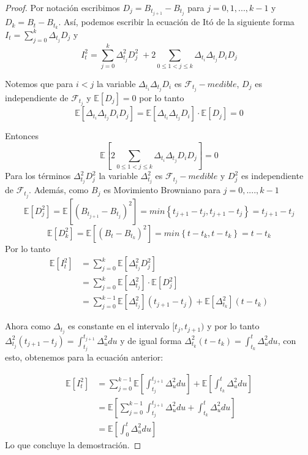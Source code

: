 \documentclass[11pt,notitlepage]{article}
\begin{document}
\begin{proof}
Por notación escribimos \(D_j=B_{t_{j+1}}-B_{t_{j}}\) para \(j=0,1,...,k-1\) y  \(D_k= B_t-B_{t_{k}}\). Así, podemos escribir la ecuación de Itó de la siguiente forma \(I_{t}=\sum_{j=0}^{k} \Delta_{t_j} D_j\) y
\[I^{2}_{t}=\sum_{j=0}^{k} \Delta^{2}_{t_j} D^2_j\;+2\sum_{0\leq 1<j\leq k} \Delta_{t_i}  \Delta_{t_j} D_iD_j\]

Notemos que para $i<j$ la variable \(\Delta_{t_i}\Delta_{t_j} D_i\) es \(\mathcal{F}_{t_{j}}-medible\), \(D_j\) es independiente de \(\mathcal{F}_{t_{j}}\) y \(\mathbb{E}[D_j]=0\) por lo tanto
\[\mathbb{E}[ \Delta_{t_i} \Delta_{t_j} D_iD_j ]=\mathbb{E}[ \Delta_{t_i} \Delta_{t_j} D_i]\cdot \mathbb{E}[D_j]=0\]

Entonces
\[\mathbb{E}\left[2\sum_{0\leq 1<j\leq k} \Delta_{t_i}  \Delta_{t_j} D_iD_j \right]=0\]
Para los términos \(\Delta^{2}_{t_j} D^2_j\)  la variable \(\Delta^{2}_{t_j}\) es \(\mathcal{F}_{t_{j}}-medible\)
y \(D^2_j\) es independiente de \(\mathcal{F}_{t_{j}}\). Además, como \(B_j\) es Movimiento Browniano para \(j=0,....,k-1\)
\[\mathbb{E}[D^2_j]=\mathbb{E}[(B_{t_{j+1}}-B_{t_{j}})^2]=min\left \{ t_{j+1}-t_j,t_{j+1}-t_j \right \}=t_{j+1}-t_j\]
\[\mathbb{E}[D^2_k]=\mathbb{E}[(B_{t}-B_{t_{k}})^2]=min\left \{ t-t_k,t-t_k \right \}=t-t_k\]
Por lo tanto
\begin{align*}
\mathbb{E}[I^{2}_{t}]&=\sum_{j=0}^{k} \mathbb{E}[\Delta^{2}_{t_j} D^2_j]\\
&= \sum_{j=0}^{k} \mathbb{E}[\Delta^{2}_{t_j}]\cdot \mathbb{E}[D^2_j] \\
&=\sum_{j=0}^{k-1} \mathbb{E}[\Delta^{2}_{t_j}](t_{j+1}-t_j)+
\mathbb{E}[\Delta^{2}_{t_k}](t-t_k)
\end{align*}

Ahora como \(\Delta_{t_j}\) es constante en el intervalo \([t_j,t_{j+1})\) y por lo tanto \(\Delta^{2}_{t_j}(t_{j+1}-t_j)=\int_{t_j}^{t_{j+1}}\Delta^{2}_{u}du\) y de igual forma  \(\Delta^{2}_{t_k}(t-t_k)=\int_{t_k}^{t}\Delta^{2}_{u}du\), con esto, obtenemos para la ecuación anterior:

\begin{align*}
\mathbb{E}[I^{2}_{t}]&=\sum_{j=0}^{k-1} \mathbb{E}\left[\int_{t_j}^{t_{j+1}}\Delta^{2}_{u}du\right]+\mathbb{E}\left[\int_{t_k}^{t}\Delta^{2}_{u}du\right]\\
&=\mathbb{E} \left [ \sum_{j=0}^{k-1} \int_{t_j}^{t_{j+1}}\Delta^{2}_{u}du+ \int_{t_k}^{t}\Delta^{2}_{u}du \right ] \\
&=\mathbb{E}\left[\int_{0}^{t}\Delta^{2}_{u}du\right]    
\end{align*} 
Lo que concluye la demostración. 
\end{proof}
\end{document}
